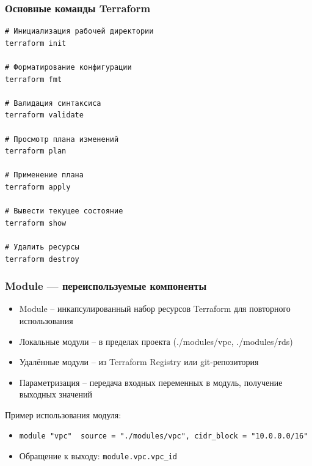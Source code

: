 \documentclass{beamer}
\begin{document}
\begin{frame}[fragile]
\frametitle{Основные команды Terraform}

\begin{verbatim}
# Инициализация рабочей директории
terraform init

# Форматирование конфигурации
terraform fmt

# Валидация синтаксиса
terraform validate

# Просмотр плана изменений
terraform plan

# Применение плана
terraform apply

# Вывести текущее состояние
terraform show

# Удалить ресурсы
terraform destroy
\end{verbatim}

\end{frame}

\begin{frame}
\frametitle{Module — переиспользуемые компоненты}

\begin{itemize}
  \item Module – инкапсулированный набор ресурсов Terraform для повторного использования
  \item Локальные модули – в пределах проекта (./modules/vpc, ./modules/rds)
  \item Удалённые модули – из Terraform Registry или git-репозитория
  \item Параметризация – передача входных переменных в модуль, получение выходных значений
\end{itemize}

Пример использования модуля:
\begin{itemize}
  \item \texttt{module "vpc" { source = "./modules/vpc", cidr\_block = "10.0.0.0/16" }}
  \item Обращение к выходу: \texttt{module.vpc.vpc\_id}
\end{itemize}

\end{frame}
\end{document}
